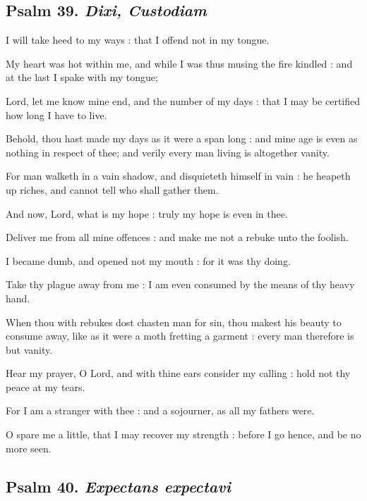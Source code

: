 \subsection{Psalm 39. \textit{Dixi, Custodiam}}

 I will take heed to my ways : that I offend not in my tongue.\par
{}
My heart was hot within me, and while I was thus musing the fire kindled : and at the last I spake with my tongue;\par
{}Lord, let me know mine end, and the number of my days : that I may be certified how long I have to live.\par
{}Behold, thou hast made my days as it were a span long : and mine age is even as nothing in respect of thee; and verily every man living is altogether vanity.\par
{}For man walketh in a vain shadow, and disquieteth himself in vain : he heapeth up riches, and cannot tell who shall gather them.\par
{}And now, Lord, what is my hope : truly my hope is even in thee.\par
{}Deliver me from all mine offences : and make me not a rebuke unto the foolish.\par
{}I became dumb, and opened not my mouth : for it was thy doing.\par
{}Take thy plague away from me : I am even consumed by the means of thy heavy hand.\par
{}When thou with rebukes dost chasten man for sin, thou makest his beauty to consume away, like as it were a moth fretting a garment : every man therefore is but vanity.\par
{}Hear my prayer, O Lord, and with thine ears consider my calling : hold not thy peace at my tears.\par
{}For I am a stranger with thee : and a sojourner, as all my fathers were.\par
{}O spare me a little, that I may recover my strength : before I go hence, and be no more seen.\par

\clearpage
\subsection{Psalm 40. \textit{Expectans expectavi}}


